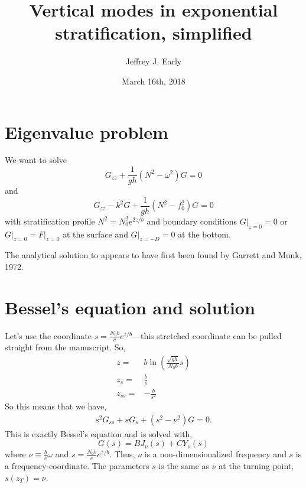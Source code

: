 \documentclass[11pt]{article}
\title{Vertical modes in exponential stratification, simplified}
\author{Jeffrey J. Early}
\date{March 16th, 2018}                                           %
\begin{document}
\maketitle

%
\section{Eigenvalue problem}
%
We want to solve
\begin{equation}
\label{vertical-eigenvalue-G-with-omega}
\tag{$\omega$-constant EVP}
G_{zz} +\frac{1}{gh} \left( N^2 - \omega^2 \right)G = 0
\end{equation}
and
\begin{equation}
\label{vertical-eigenvalue-G-with-K}
\tag{$K$-constant EVP}
G_{zz} - k^2 G +\frac{1}{gh} \left( N^2 - f_0^2 \right)G = 0
\end{equation}
with stratification profile $N^2 = N_0^2 e^{2z/b}$ and boundary conditions $G\rvert_{z=0}=0$ or $G\rvert_{z=0}=F\rvert_{z=0}$ at the surface and $G\rvert_{z=-D}=0$ at the bottom.

The analytical solution to appears to have first been found by Garrett and Munk, 1972.

%
\section{Bessel's equation and solution}
%
Let's use the coordinate $s = \frac{N_0b}{c}  e^{z/b}$---this stretched coordinate can be pulled straight from the manuscript. So,
\begin{align}
z =& b\ln \left( \frac{\sqrt{gh}}{N_0 b} s \right) \\
z_s =& \frac{b}{s} \\
z_{ss} =& -\frac{b}{s^2}
\end{align} So this means that we have,
\begin{align}
s^2 G_{ss} + s G_s + \left( s^2 - \nu^2 \right)G = 0.
\end{align}
This is exactly Bessel's equation and is solved with,
\begin{equation}
\label{general_solution}
G(s) = B J_{\nu} \left( s \right) + C Y_{\nu} \left( s \right)
\end{equation}
where $\nu \equiv \frac{b}{c} \omega$ and $s= \frac{N_0b}{c}  e^{z/b}$. Thus, $\nu$ is a non-dimensionalized frequency and $s$ is a frequency-coordinate. The parameters $s$ is the same as $\nu$ at the turning point, $s(z_T)=\nu$.
\end{document}
